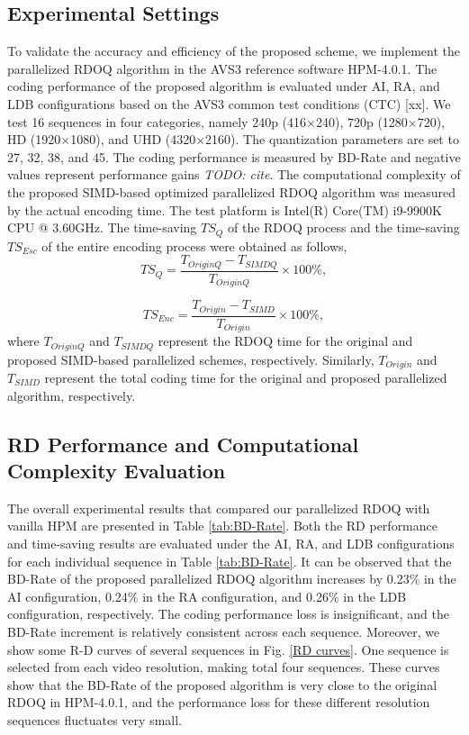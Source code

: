 \documentclass[lettersize,journal]{IEEEtran}
\begin{document}
\subsection{Experimental Settings} 
To validate the accuracy and efficiency of the proposed scheme, we implement the parallelized RDOQ algorithm in the AVS3 reference software HPM-4.0.1. The coding performance of the proposed algorithm is evaluated under AI, RA, and LDB configurations based on the AVS3 common test conditions (CTC) [xx]. We test 16 sequences in four categories, namely 240p (416×240), 720p (1280×720), HD (1920×1080), and UHD (4320×2160). The quantization parameters are set to 27, 32, 38, and 45. The coding performance is measured by BD-Rate and negative values represent performance gains \emph{TODO: cite}. The computational complexity of the proposed SIMD-based optimized parallelized RDOQ algorithm was measured by the actual encoding time. The test platform is Intel(R) Core(TM) i9-9900K CPU @ 3.60GHz. The time-saving $TS_{Q}$ of the RDOQ process and the time-saving $TS_{Esc}$ of the entire encoding process were obtained as follows, 
\begin{equation}
	\label{TSQ}
    TS_{Q} = \frac{T_{OriginQ}-T_{SIMDQ}}{T_{OriginQ}} \times 100\%,
\end{equation}

\begin{equation}
	\label{TSEnc}
	TS_{Enc} = \frac{T_{Origin}-T_{SIMD}}{T_{Origin}} \times 100\%,
\end{equation}
where $T_{OriginQ}$ and $T_{SIMDQ}$ represent the RDOQ time for the original and proposed SIMD-based parallelized schemes, respectively. Similarly, $T_{Origin}$ and $T_{SIMD}$ represent the total coding time for the original and proposed parallelized algorithm, respectively. 

\subsection{RD Performance and Computational Complexity Evaluation}
The overall experimental results that compared our parallelized RDOQ with vanilla HPM are presented in Table \ref{tab:BD-Rate}. Both the RD performance and time-saving results are evaluated under the AI, RA, and LDB configurations for each individual sequence in Table \ref{tab:BD-Rate}. It can be observed that the BD-Rate of the proposed parallelized RDOQ algorithm increases by 0.23\% in the AI configuration, 0.24\% in the RA configuration, and 0.26\% in the LDB configuration, respectively. The coding performance loss is insignificant, and the BD-Rate increment is relatively consistent across each sequence. Moreover, we show some R-D curves of several sequences in Fig. \ref{RD curves}. One sequence is selected from each video resolution, making total four sequences. These curves show that the BD-Rate of the proposed algorithm is very close to the original RDOQ in HPM-4.0.1, and the performance loss for these different resolution sequences fluctuates very small. 
\end{document}
